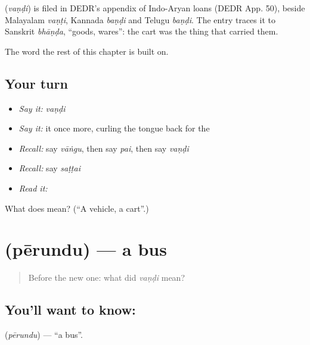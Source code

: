 \begin{cousinweb}
\textbf{} (\emph{vaṇḍi}) is filed in DEDR's appendix of Indo-Aryan loans (DEDR App. 50), beside Malayalam \emph{vaṇṭi}, Kannada \emph{baṇḍi} and Telugu \emph{baṇḍi}. The entry traces it to Sanskrit \emph{bhāṇḍa}, \textquotedblleft{}goods, wares\textquotedblright{}: the cart was the thing that carried them.
\end{cousinweb}

\begin{grammarlens}[title={What you've built}]
The word the rest of this chapter is built on.
\end{grammarlens}

\subsection*{Your turn}
\begin{itemize}
\raggedright
  \item \emph{Say it:} \emph{vaṇḍi}
  \item \emph{Say it:} it once more, curling the tongue back for the 
  \item \emph{Recall:} say \emph{vāṅgu}, then say \emph{pai}, then say \emph{vaṇḍi}
  \item \emph{Recall:} say \emph{saṭṭai}
  \item \emph{Read it:} \textbf{}
\end{itemize}

\begin{tcolorbox}[breakable,colback=teal!4,colframe=teal!35!black,title={Before you move on}]
What does  mean? (\textquotedblleft{}A vehicle, a cart\textquotedblright{}.)
\end{tcolorbox}
\section[\texorpdfstring{\ta{பேருந்து} (pērundu)}{பேருந்து (pērundu)}]{ (pērundu) — a bus}

\label{lesson:TA-C69-bus}



\begin{quote}
Before the new one: what did \emph{vaṇḍi} mean?
\end{quote}

\subsection*{You'll want to know: }
\textbf{} (\emph{pērundu}) — \textquotedblleft{}a bus\textquotedblright{}.

